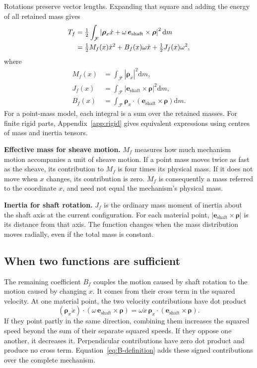 \documentclass[11pt,letterpaper]{article}
\numberwithin{equation}{section}
\newcommand{\dd}{\mathrm{d}}
\newcommand{\e}{\bm e_{\mathrm{shaft}}}
\newcommand{\rhoo}{\bm\rho}
\newcommand{\half}{\tfrac12}
\newcommand{\term}[1]{\par\needspace{4\baselineskip}\textbf{#1}\enspace}
\begin{document}
Rotations preserve vector lengths. Expanding that square and adding the energy of all retained mass gives
\begin{align}
  T_f
    &=\half\int_{\mathcal F}
      \left|\rhoo_x\dot x+\omega\,\e\times\rhoo\right|^2\dd m
      \notag\\
    &=\half M_f(x)\dot x^2+B_f(x)\omega\dot x
       +\half J_f(x)\omega^2,
       \label{eq:full-energy}
\end{align}
where
\begin{align}
  M_f(x)&=\int_{\mathcal F}|\rhoo_x|^2\dd m,
       \label{eq:M-definition}\\
  J_f(x)&=\int_{\mathcal F}|\e\times\rhoo|^2\dd m,
       \label{eq:J-definition}\\
  B_f(x)&=\int_{\mathcal F}\rhoo_x\cdot(\e\times\rhoo)\dd m.
       \label{eq:B-definition}
\end{align}
For a point-mass model, each integral is a sum over the retained masses. For finite rigid parts, Appendix~\ref{app:rigid} gives equivalent expressions using centres of mass and inertia tensors.

\term{Effective mass for sheave motion.}
$M_f$ measures how much mechanism motion accompanies a unit of sheave motion. If a point mass moves twice as fast as the sheave, its contribution to $M_f$ is four times its physical mass. If it does not move when $x$ changes, its contribution is zero. $M_f$ is consequently a mass referred to the coordinate $x$, and need not equal the mechanism's physical mass.

\term{Inertia for shaft rotation.}
$J_f$ is the ordinary mass moment of inertia about the shaft axis at the current configuration. For each material point, $|\e\times\rhoo|$ is its distance from that axis. The function changes when the mass distribution moves radially, even if the total mass is constant.

\subsection{When two functions are sufficient}
\label{sec:no-mixed}

The remaining coefficient $B_f$ couples the motion caused by shaft rotation to the motion caused by changing $x$. It comes from their cross term in the squared velocity. At one material point, the two velocity contributions have dot product
\begin{equation}
  (\rhoo_x\dot x)\cdot(\omega\,\e\times\rhoo)
  =\omega\dot x\,\rhoo_x\cdot(\e\times\rhoo).
  \label{eq:velocity-dot}
\end{equation}
If they point partly in the same direction, combining them increases the squared speed beyond the sum of their separate squared speeds. If they oppose one another, it decreases it. Perpendicular contributions have zero dot product and produce no cross term. Equation~\eqref{eq:B-definition} adds these signed contributions over the complete mechanism.
\end{document}
